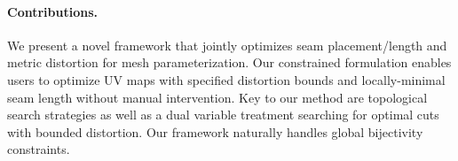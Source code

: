 \paragraph*{Contributions.} 
We present a novel framework that jointly optimizes seam placement/length and metric distortion for mesh parameterization. %
Our constrained formulation %
enables users to optimize UV maps with specified distortion bounds and %
locally-minimal seam length without manual intervention.
%
Key to our method are topological search strategies as well as a dual variable treatment searching for optimal cuts with bounded distortion. Our framework naturally handles %
global bijectivity constraints. %